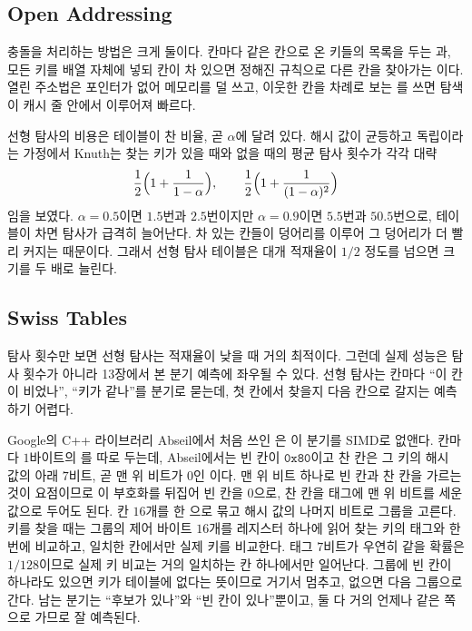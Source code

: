\subsection{Open Addressing}

충돌을 처리하는 방법은 크게 둘이다. 칸마다 같은 칸으로 온 키들의 목록을 두는 과, 모든 키를 배열 자체에 넣되 칸이 차 있으면 정해진 규칙으로 다른 칸을 찾아가는 이다\cite{peterson1957}. 열린 주소법은 포인터가 없어 메모리를 덜 쓰고, 이웃한 칸을 차례로 보는 를 쓰면 탐색이 캐시 줄 안에서 이루어져 빠르다.

선형 탐사의 비용은 테이블이 찬 비율, 곧  $\alpha$에 달려 있다. 해시 값이 균등하고 독립이라는 가정에서 Knuth는 찾는 키가 있을 때와 없을 때의 평균 탐사 횟수가 각각 대략
\[
\frac12\Bigl(1+\frac1{1-\alpha}\Bigr),\qquad\frac12\Bigl(1+\frac1{(1-\alpha)^2}\Bigr)
\]
임을 보였다\cite{knuth1998taocp3}. $\alpha=0.5$이면 $1.5$번과 $2.5$번이지만 $\alpha=0.9$이면 $5.5$번과 $50.5$번으로, 테이블이 차면 탐사가 급격히 늘어난다. 차 있는 칸들이 덩어리를 이루어 그 덩어리가 더 빨리 커지는  때문이다. 그래서 선형 탐사 테이블은 대개 적재율이 $1/2$ 정도를 넘으면 크기를 두 배로 늘린다.

\subsection{Swiss Tables}

탐사 횟수만 보면 선형 탐사는 적재율이 낮을 때 거의 최적이다. 그런데 실제 성능은 탐사 횟수가 아니라 13장에서 본 분기 예측에 좌우될 수 있다. 선형 탐사는 칸마다 ``이 칸이 비었나'', ``키가 같나''를 분기로 묻는데, 첫 칸에서 찾을지 다음 칸으로 갈지는 예측하기 어렵다.

Google의 C++ 라이브러리 Abseil에서 처음 쓰인 은 이 분기를 SIMD로 없앤다. 칸마다 $1$바이트의 를 따로 두는데, Abseil에서는 빈 칸이 $\mathtt{0x80}$이고 찬 칸은 그 키의 해시 값의 아래 $7$비트, 곧 맨 위 비트가 $0$인 이다. 맨 위 비트 하나로 빈 칸과 찬 칸을 가르는 것이 요점이므로 이 부호화를 뒤집어 빈 칸을 $0$으로, 찬 칸을 태그에 맨 위 비트를 세운 값으로 두어도 된다. 칸 $16$개를 한 으로 묶고 해시 값의 나머지 비트로 그룹을 고른다. 키를 찾을 때는 그룹의 제어 바이트 $16$개를 레지스터 하나에 읽어 찾는 키의 태그와 한 번에 비교하고, 일치한 칸에서만 실제 키를 비교한다. 태그 $7$비트가 우연히 같을 확률은 $1/128$이므로 실제 키 비교는 거의 일치하는 칸 하나에서만 일어난다. 그룹에 빈 칸이 하나라도 있으면 키가 테이블에 없다는 뜻이므로 거기서 멈추고, 없으면 다음 그룹으로 간다. 남는 분기는 ``후보가 있나''와 ``빈 칸이 있나''뿐이고, 둘 다 거의 언제나 같은 쪽으로 가므로 잘 예측된다.

